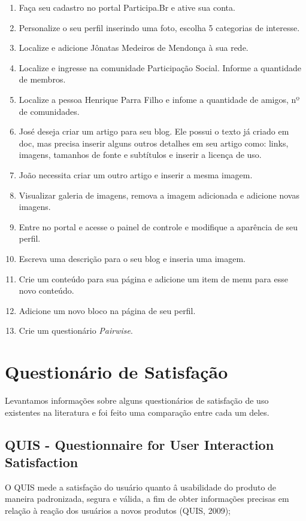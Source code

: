 \begin{enumerate}
	\item Faça seu cadastro no portal Participa.Br e ative sua conta.
	\item Personalize o seu perfil inserindo uma foto, escolha 5 categorias de interesse.
	\item Localize e adicione Jônatas Medeiros de Mendonça à sua rede.
	\item Localize e ingresse na comunidade Participação Social. Informe a quantidade de membros.
	\item Localize a pessoa Henrique Parra Filho e infome a quantidade de amigos, nº de comunidades.
	\item José deseja criar um artigo para seu blog. Ele possui o texto já criado em doc, mas precisa inserir alguns outros detalhes em seu artigo como: links, imagens, tamanhos de fonte e subtítulos e inserir a licença de uso.
	\item João necessita criar um outro artigo e inserir a mesma imagem.
	\item Visualizar galeria de imagens, remova a imagem adicionada e adicione novas imagens.
	\item Entre no portal e acesse o painel de controle e modifique a aparência de seu perfil.
	\item Escreva uma descrição para o seu blog e inseria uma imagem.
	\item Crie um conteúdo para sua página e adicione um item de menu para esse novo conteúdo.
	\item Adicione um novo bloco na página de seu perfil.
	\item Crie um questionário \textit{Pairwise}.
\end{enumerate}


\section{Questionário de Satisfação}

	Levantamos informações sobre alguns questionários de satisfação de uso existentes na literatura e foi feito uma comparação entre cada um deles.

\subsection{QUIS - Questionnaire for User Interaction Satisfaction}

	O QUIS mede a satisfação do usuário quanto â usabilidade do produto de maneira padronizada, segura e válida, a fim de obter informações precisas em relação à reação dos usuários a novos produtos (QUIS, 2009);

